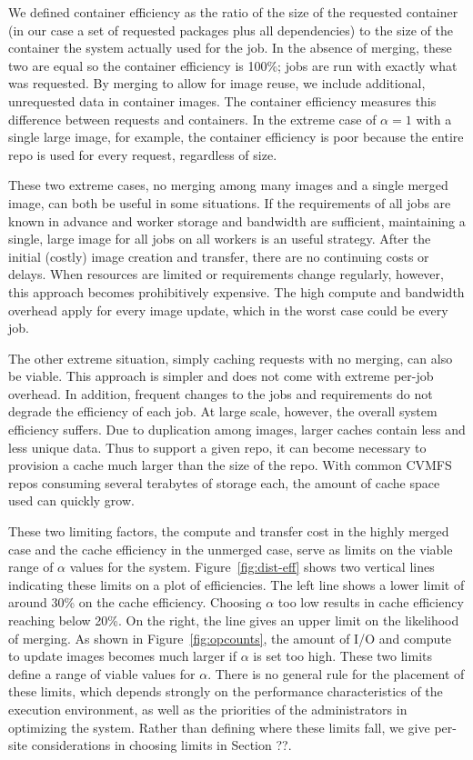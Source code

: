\documentclass[sigconf]{acmart}
\begin{document}
We defined container efficiency as the ratio of the size of the requested container
(in our case a set of requested packages plus all dependencies)
to the size of the container the system actually used for the job.
In the absence of merging,
these two are equal so the container efficiency is 100\%;
jobs are run with exactly what was requested.
By merging to allow for image reuse,
we include additional, unrequested data in container images.
The container efficiency measures this difference between requests and containers.
In the extreme case of $\alpha=1$ with a single large image, for example,
the container efficiency is poor because the entire repo is used for every request,
regardless of size.

These two extreme cases, no merging among many images and a single merged image,
can both be useful in some situations.
If the requirements of all jobs are known in advance and worker storage and bandwidth are sufficient,
maintaining a single, large image for all jobs on all workers is an useful strategy.
After the initial (costly) image creation and transfer,
there are no continuing costs or delays.
When resources are limited or requirements change regularly,
however, this approach becomes prohibitively expensive.
The high compute and bandwidth overhead apply for every image update,
which in the worst case could be every job.

The other extreme situation,
simply caching requests with no merging,
can also be viable.
This approach is simpler and does not come with extreme per-job overhead.
In addition, frequent changes to the jobs and requirements do not degrade the efficiency of each job.
At large scale, however,
the overall system efficiency suffers.
Due to duplication among images,
larger caches contain less and less unique data.
Thus to support a given repo,
it can become necessary to provision a cache much larger than the size of the repo.
With common CVMFS repos consuming several terabytes of storage each,
the amount of cache space used can quickly grow.

These two limiting factors,
the compute and transfer cost in the highly merged case and the cache efficiency in the unmerged case,
serve as limits on the viable range of $\alpha$ values for the system.
Figure~\ref{fig:dist-eff} shows two vertical lines indicating these limits on a plot of efficiencies.
The left line shows a lower limit of around 30\% on the cache efficiency.
Choosing $\alpha$ too low results in cache efficiency reaching below 20\%.
On the right, the line gives an upper limit on the likelihood of merging.
As shown in Figure~\ref{fig:opcounts},
the amount of I/O and compute to update images becomes much larger if $\alpha$ is set too high.
These two limits define a range of viable values for $\alpha$.
There is no general rule for the placement of these limits,
which depends strongly on the performance characteristics of the execution environment,
as well as the priorities of the administrators in optimizing the system.
Rather than defining where these limits fall,
we give per-site considerations in choosing limits in Section ??.
\end{document}
